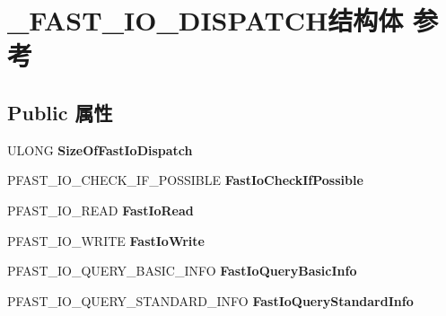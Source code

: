 \hypertarget{struct___f_a_s_t___i_o___d_i_s_p_a_t_c_h}{}\section{\+\_\+\+F\+A\+S\+T\+\_\+\+I\+O\+\_\+\+D\+I\+S\+P\+A\+T\+C\+H结构体 参考}
\label{struct___f_a_s_t___i_o___d_i_s_p_a_t_c_h}
\subsection*{Public 属性}
\begin{DoxyCompactItemize}
\item 
\mbox{\label{struct___f_a_s_t___i_o___d_i_s_p_a_t_c_h_a75361f9c03a5bea4af73305fd2515e07}} 
U\+L\+O\+NG {\bfseries Size\+Of\+Fast\+Io\+Dispatch}
\item 
\mbox{\label{struct___f_a_s_t___i_o___d_i_s_p_a_t_c_h_ac6bd762547cec0a511c6ec9f7d12e35b}} 
P\+F\+A\+S\+T\+\_\+\+I\+O\+\_\+\+C\+H\+E\+C\+K\+\_\+\+I\+F\+\_\+\+P\+O\+S\+S\+I\+B\+LE {\bfseries Fast\+Io\+Check\+If\+Possible}
\item 
\mbox{\label{struct___f_a_s_t___i_o___d_i_s_p_a_t_c_h_a8e29d5f106078c4651c68122a5fc7a5c}} 
P\+F\+A\+S\+T\+\_\+\+I\+O\+\_\+\+R\+E\+AD {\bfseries Fast\+Io\+Read}
\item 
\mbox{\label{struct___f_a_s_t___i_o___d_i_s_p_a_t_c_h_a3ae86b67cc70d4e417ba7dd033ee405d}} 
P\+F\+A\+S\+T\+\_\+\+I\+O\+\_\+\+W\+R\+I\+TE {\bfseries Fast\+Io\+Write}
\item 
\mbox{\label{struct___f_a_s_t___i_o___d_i_s_p_a_t_c_h_a8ff01a128c90657048d1693c96b05de6}} 
P\+F\+A\+S\+T\+\_\+\+I\+O\+\_\+\+Q\+U\+E\+R\+Y\+\_\+\+B\+A\+S\+I\+C\+\_\+\+I\+N\+FO {\bfseries Fast\+Io\+Query\+Basic\+Info}
\item 
\mbox{\label{struct___f_a_s_t___i_o___d_i_s_p_a_t_c_h_a13f19fdc9096fe981e2b9a30da5d98bb}} 
P\+F\+A\+S\+T\+\_\+\+I\+O\+\_\+\+Q\+U\+E\+R\+Y\+\_\+\+S\+T\+A\+N\+D\+A\+R\+D\+\_\+\+I\+N\+FO {\bfseries Fast\+Io\+Query\+Standard\+Info}

\end{DoxyCompactItemize}
